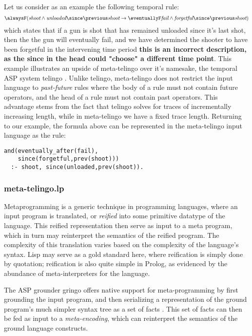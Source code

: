 Let us consider as an example the following temporal rule:
\begin{equation*}
\alwaysF(\textit{shoot} \wedge \textit{unloaded} \since \previous \textit{shoot} 
\rightarrow \eventuallyF \textit{fail} \wedge \textit{forgetful} \since \previous \textit{shoot})
\end{equation*}
which states that if a gun is shot that has remained unloaded since
it's last shot, then the the gun will eventually fail, and we have
determined the shooter to have been forgetful in the intervening time
period \textbf{this is an incorrect description, as the since in the head could "choose" a different time point}. This example illustrates an upside of meta-telingo over it's
namesake, the temporal ASP system telingo\cite{cakamosc19a}
\cite{agcadipescscvi20a}. Unlike telingo, meta-telingo does not
restrict the input language to \emph{past-future} rules
\cite{agcadipescscvi20a} where the body of a rule must not contain
future operators, and the head of a rule must not contain past
operators. This advantage stems from the fact that telingo solves for
traces of incrementally increasing length, while in meta-telingo we
have a fixed trace length. Returning to our example, the formula above
can be represented in the meta-telingo input language as the
rule:
\begin{center}
    \begin{lstlisting}[numbers=none]
and(eventually_after(fail),
    since(forgetful,prev(shoot))) 
  :- shoot, since(unloaded,prev(shoot)).
    \end{lstlisting}
\end{center}

\subsubsection{meta-telingo.lp}

Metaprogramming is a generic technique in programming languages, where
an input program is translated, or \emph{reified} into some primitive
datatype of the language. This reified representation then serve as
input to a meta program, which in turn may reinterpret the semantics
of the reified program. The complexity of this translation varies
based on the complexity of the language's syntax. Lisp may serve as a
gold standard here, where reification is simply done by quotation;
reification is also quite simple in Prolog, as evidenced by the
abundance of meta-interpreters for the language. 

The ASP grounder gringo offers native support for meta-programming by
first grounding the input program, and then serializing a
representation of the ground program's much simpler syntax tree as a
set of facts \cite{karoscwa21a}. This set of facts can then be fed as
input to a \emph{meta-encoding}, which can reinterpret the semantics
of the ground language constructs.

